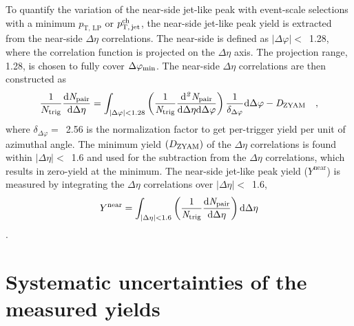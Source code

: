 To quantify the variation of the near-side jet-like peak with event-scale selections with a minimum $p_\mathrm{T,\,LP}$ or $p_\mathrm{T,\,jet}^\mathrm{ch}$, the near-side jet-like peak yield is extracted from the near-side $\Delta\eta$ correlations. The near-side is defined as $|\Delta\varphi|<$~1.28, where the correlation function is projected on the $\Delta\eta$ axis. The projection range, 1.28, is chosen to fully cover $\Delta\varphi_{\rm{min}}$. The near-side $\Delta\eta$ correlations are then constructed as
\begin{eqnarray}
\frac{1}{N_{\rm{trig}}} \frac{ \rm{d}\it{}N_{\rm{pair}} }{ \rm{d}\Delta\eta } = \int_{|\Delta \varphi|<1.28} \left( \frac{1}{\it{N}_{\rm{trig}}} \frac{ \rm{d}\it{}^{2} N_{\rm{pair}} }{ \rm{d}\Delta\eta d\Delta\varphi} \right) \dfrac{1}{\delta_{\Delta\varphi}} \rm{d} \Delta \varphi - \it{D}_{\rm{ZYAM}} \quad,
\end{eqnarray}
where $\delta_{\Delta\varphi}=$~2.56 is the normalization factor to get per-trigger yield per unit of azimuthal angle.
The minimum yield $(D_{\rm{ZYAM}})$ of the $\Delta\eta$ correlations is found within $|\Delta\eta|<$~1.6 and used for the subtraction from  the $\Delta\eta$ correlations, which results in zero-yield at the minimum. The near-side jet-like peak yield ($Y^{\mathrm{near}}$) is measured by integrating the $\Delta\eta$ correlations over $|\Delta\eta|<$~1.6,
\begin{eqnarray}
Y^{\rm{near}} = \int_{|\Delta \eta|<1.6} \left( \frac{1}{\it{N}_{\rm{trig}}} \frac{ \rm{d}\it{}N_{\rm{pair}} }{ \rm{d}\Delta\eta } \right) \rm{d} \Delta\eta
\end{eqnarray} .



\section{Systematic uncertainties of the measured yields}
\label{sec:uncertainties}

